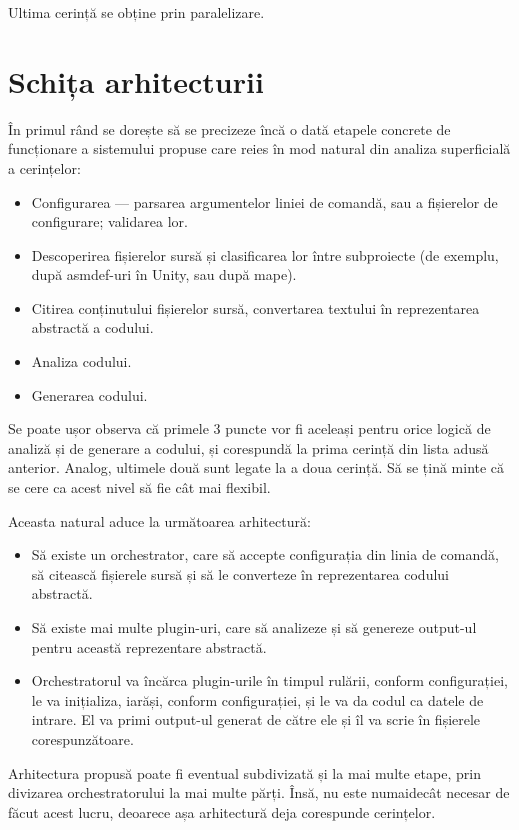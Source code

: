 \documentclass[a4paper,12pt]{report}
\begin{document}
Ultima cerință se obține prin paralelizare.

\section{Schița arhitecturii}

În primul rând se dorește să se precizeze încă o dată etapele concrete de funcționare a sistemului propuse care reies în mod natural din analiza superficială a cerințelor:

\begin{itemize}
\item Configurarea --- parsarea argumentelor liniei de comandă, sau a fișierelor de configurare; validarea lor.
\item Descoperirea fișierelor sursă și clasificarea lor între subproiecte (de exemplu, după asmdef-uri în Unity, sau după mape).
\item Citirea conținutului fișierelor sursă, convertarea textului în reprezentarea abstractă a codului.
\item Analiza codului.
\item Generarea codului.
\end{itemize}

Se poate ușor observa că primele 3 puncte vor fi aceleași pentru orice logică de analiză și de generare a codului, și corespundă la prima cerință din lista adusă anterior.
Analog, ultimele două sunt legate la a doua cerință.
Să se țină minte că se cere ca acest nivel să fie cât mai flexibil.

Aceasta natural aduce la următoarea arhitectură:

\begin{itemize}
  \item Să existe un orchestrator, care să accepte configurația din linia de comandă, să citească fișierele sursă și să le converteze în reprezentarea codului abstractă.
  \item Să existe mai multe plugin-uri, care să analizeze și să genereze output-ul pentru această reprezentare abstractă.
  \item Orchestratorul va încărca plugin-urile în timpul rulării, conform configurației, le va inițializa, iarăși, conform configurației, și le va da codul ca datele de intrare. El va primi output-ul generat de către ele și îl va scrie în fișierele corespunzătoare.
\end{itemize}

Arhitectura propusă poate fi eventual subdivizată și la mai multe etape, prin divizarea orchestratorului la mai multe părți.
Însă, nu este numaidecât necesar de făcut acest lucru, deoarece așa arhitectură deja corespunde cerințelor.
\end{document}
